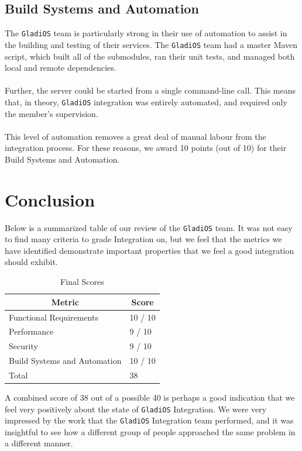 \documentclass[12pt,a4paper,titlepage]{article}
\begin{document}
\subsection{Build Systems and Automation}

The \texttt{GladiOS} team is particularly strong in their use of automation to assist in
the building and testing of their services. The \texttt{GladiOS} team had a master Maven
script, which built all of the submodules, ran their unit tests, and managed
both local and remote dependencies.
\\\\
Further, the server could be started from a single command-line call. This means
that, in theory, \texttt{GladiOS} integration was entirely automated, and required only
the member's supervision.
\\\\
This level of automation removes a great deal of manual labour from the
integration process. For these reasons, we award 10 points (out of 10) for their
Build Systems and Automation.

\section{Conclusion}

Below is a summarized table of our review of the \texttt{GladiOS} team. It was not easy
to find many criteria to grade Integration on, but we feel that the metrics we
have identified demonstrate important properties that we feel a good integration
should exhibit.


\begin{table}[ht!]
\centering
\caption{Final Scores}
\label{my-label}
\begin{tabular}{|l|l|}
\hline
\multicolumn{1}{|c|}{Metric} & \multicolumn{1}{c|}{Score} \\ \hline
Functional Requirements      & 10 / 10                    \\ \hline
Performance                  & 9 / 10                     \\ \hline
Security                     & 9 / 10                     \\ \hline
Build Systems and Automation & 10 / 10                    \\ \hline
Total                        & 38                         \\ \hline
\end{tabular}
\end{table}

A combined score of 38 out of a possible 40 is perhaps a good indication that we
feel very positively about the state of \texttt{GladiOS} Integration. We were very
impressed by the work that the \texttt{GladiOS} Integration team performed, and it was
insightful to see how a different group of people approached the same problem in
a different manner.
\end{document}
